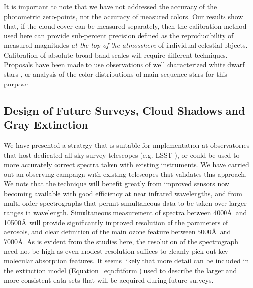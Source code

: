 \documentclass[manuscript]{aastex}
\begin{document}
It is important to note that we have not addressed the accuracy of the photometric zero-points, nor the accuracy of measured colors.
Our results show that, if the cloud cover can be measured separately, then the calibration
method used here can provide sub-percent precision defined as the reproducibility of measured magnitudes {\it at the top of the atmosphere}
of individual celestial objects.
Calibration of absolute broad-band scales will require different techniques.
Proposals have been made to use observations of well characterized white dwarf stars \cite{holberg06},
or analysis of the color distributions of main sequence stars \cite{macdonald04} \cite{ivezic07} \cite{sale09} \cite{high09} for this purpose.    

\subsection{Design of Future Surveys, Cloud Shadows and Gray Extinction}

We have presented a strategy that is suitable for implementation at observatories that host dedicated all-sky survey telescopes (e.g. LSST \cite{ivezic09}),
or could be used to more accurately correct spectra taken with existing instruments.
We have carried out an observing campaign with existing telescopes that validates this approach.
We note that the technique will benefit greatly from improved sensors now becoming available with good efficiency at near infrared wavelengths,
and from multi-order spectrographs that permit simultaneous data to be taken over larger ranges in wavelength.
Simultaneous measurement of spectra between 4000\AA~and 10500\AA~will provide significantly improved resolution of the parameters of aerosols,
and clear definition of the main ozone feature between 5000\AA~and 7000\AA.
As is evident from the studies here, the resolution of the spectrograph need not be high as even modest resolution suffices to cleanly 
pick out key molecular absorption features.
It seems likely that more detail can be included in the extinction model (Equation~\ref{eqn:fitform}) used to describe the larger
and more consistent data sets that will be acquired during future surveys.
  
\end{document}
